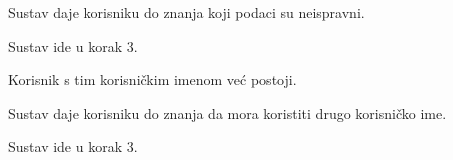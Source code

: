 \begin{packed_item}
\begin{packed_item}
\begin{packed_enum}
						\item Sustav daje korisniku do znanja koji podaci su neispravni.
						\item Sustav ide u korak 3.
						
					\end{packed_enum}
					
					\item[6.a] Korisnik s tim korisničkim imenom već postoji. 
					\item[] \begin{packed_enum}
						
						\item Sustav daje korisniku do znanja da mora koristiti drugo korisničko ime.
						\item Sustav ide u korak 3.
						
					\end{packed_enum}
					
				\end{packed_item}
			\end{packed_item}


